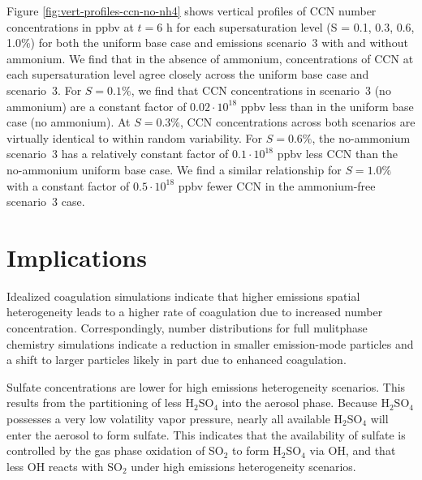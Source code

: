 Figure \ref{fig:vert-profiles-ccn-no-nh4} shows vertical profiles of CCN number concentrations in ppbv at $t=6$ h for each supersaturation level (S = 0.1, 0.3, 0.6, 1.0\%) for both the uniform base case and emissions scenario~3 with and without ammonium. We find that in the absence of ammonium, concentrations of CCN at each supersaturation level agree closely across the uniform base case and scenario~3. For $S=0.1\%$, we find that CCN concentrations in scenario~3 (no ammonium) are a constant factor of $0.02\cdot10^{18}$ ppbv less than in the uniform base case (no ammonium). At $S=0.3\%$, CCN concentrations across both scenarios are virtually identical to within random variability. For $S=0.6\%$, the no-ammonium scenario~3 has a relatively constant factor of $0.1\cdot10^{18}$ ppbv less CCN than the no-ammonium uniform base case. We find a similar relationship for $S=1.0\%$ with a constant factor of $0.5\cdot10^{18}$ ppbv fewer CCN in the ammonium-free scenario~3 case. 


\section{Implications}


Idealized coagulation simulations indicate that higher emissions spatial heterogeneity leads to a higher rate of coagulation due to increased number concentration. Correspondingly, number distributions for full mulitphase chemistry simulations indicate a reduction in smaller emission-mode particles and a shift to larger particles likely in part due to enhanced coagulation.

Sulfate concentrations are lower for high emissions heterogeneity scenarios. This results from the partitioning of less H$_2$SO$_4$ into the aerosol phase. Because H$_2$SO$_4$ possesses a very low volatility vapor pressure, nearly all available H$_2$SO$_4$ will enter the aerosol to form sulfate. This indicates that the availability of sulfate is controlled by the gas phase oxidation of SO$_2$ to form H$_2$SO$_4$ via OH, and that less OH reacts with SO$_2$ under high emissions heterogeneity scenarios. 

